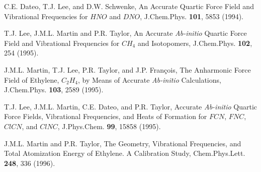 \begin{thebibliography}{999}
%

C.E. Dateo, T.J. Lee, and D.W. Schwenke,
An Accurate Quartic Force Field and Vibrational Frequencies
for $HNO$ and $DNO$,
J.Chem.Phys. {\bf 101}, 5853 (1994).





T.J. Lee, J.M.L. Martin and P.R. Taylor,
An Accurate {\it Ab-initio} Quartic Force Field and Vibrational
Frequencies for $CH_4$ and Isotopomers,
J.Chem.Phys. {\bf 102}, 254 (1995).

J.M.L. Martin, T.J. Lee, P.R. Taylor,
and J.P. Fran\c{c}ois,
The Anharmonic Force Field of Ethylene, $C_2H_4$, by Means of
Accurate {\it Ab-initio} Calculations,
J.Chem.Phys. {\bf 103}, 2589 (1995).

T.J. Lee,
J.M.L. Martin, C.E. Dateo, and P.R. Taylor,
Accurate {\it Ab-initio} Quartic Force Fields,
Vibrational Frequencies, and Heats of Formation
for $FCN$, $FNC$, $ClCN$, and $ClNC$,
J.Phys.Chem. {\bf 99}, 15858 (1995).

J.M.L. Martin and P.R. Taylor,
The Geometry, Vibrational Frequencies, and Total Atomization
Energy of Ethylene. A Calibration Study,
Chem.Phys.Lett. {\bf 248}, 336 (1996).


\end{thebibliography}

